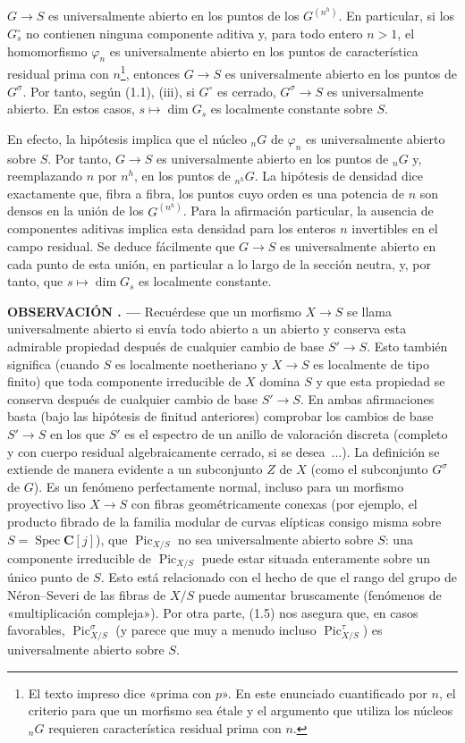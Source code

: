 \documentclass[11pt,twoside,openany]{book}
\numberwithin{equation}{section}
\newcommand{\src}[1]{%
  \phantomsection\hypertarget{src:#1}{}%
  \marginpar{\raggedleft\footnotesize\sffamily #1}%
}
\theoremstyle{plain}
\theoremstyle{definition}
\theoremstyle{remark}
\newcommand{\result}[2]{%
  \par\medskip\noindent\textbf{#1%
  \if\relax\detokenize{#2}\relax\else\space#2\fi. ---}\enspace
}
\newcommand{\FgaUnitKey}{frontmatter}
\renewcommand{\src}[1]{%
  \phantomsection\hypertarget{src:\FgaUnitKey:#1}{}%
  \marginpar{\raggedleft\footnotesize\sffamily #1}%
}
\theoremstyle{plain}
\theoremstyle{definition}
\theoremstyle{remark}
\begin{document}
\src{228}
$G\longrightarrow S$ es universalmente abierto en los puntos de los
$G^{(n^h)}$. En particular, si los $G_s^\circ$ no contienen ninguna componente
aditiva y, para todo entero $n>1$, el homomorfismo $\varphi_n$ es
universalmente abierto en los puntos de característica residual prima con
$n$\footnote{El texto impreso dice «prima con $p$». En este enunciado
cuantificado por $n$, el criterio para que un morfismo sea étale y el argumento que utiliza los
núcleos $ {}_nG$ requieren característica residual prima con $n$.}, entonces
$G\longrightarrow S$ es universalmente abierto en los puntos de $G^\sigma$.
Por tanto, según (1.1), (iii), si $G^\circ$ es cerrado,
$G^\sigma\longrightarrow S$ es universalmente abierto. En estos casos,
$s\longmapsto\dim G_s$ es localmente constante sobre $S$.

En efecto, la hipótesis implica que el núcleo $ {}_nG$ de $\varphi_n$ es
universalmente abierto sobre $S$. Por tanto, $G\longrightarrow S$ es
universalmente abierto en los puntos de $ {}_nG$ y, reemplazando $n$ por
$n^h$, en los puntos de $ {}_{n^h}G$. La hipótesis de densidad dice exactamente que, fibra a fibra, los puntos cuyo
orden es una potencia de $n$ son densos en la unión de los $G^{(n^h)}$. Para
la afirmación particular, la ausencia de componentes aditivas implica esta
densidad para los enteros $n$ invertibles en el campo residual. Se deduce fácilmente que
$G\longrightarrow S$ es universalmente abierto en cada punto de esta unión,
en particular a lo largo de la sección neutra, y, por tanto, que
$s\longmapsto\dim G_s$ es localmente constante.

\result{OBSERVACIÓN}{1.6} Recuérdese que un morfismo $X\longrightarrow S$ se
llama universalmente abierto si envía todo abierto a un abierto y conserva
esta admirable propiedad después de cualquier cambio de base
$S'\longrightarrow S$. Esto también significa (cuando $S$ es localmente
noetheriano y $X\longrightarrow S$ es localmente de tipo finito) que toda
componente irreducible de $X$ domina $S$ y que esta propiedad se conserva
después de cualquier cambio de base $S'\longrightarrow S$. En ambas
afirmaciones basta (bajo las hipótesis de finitud anteriores) comprobar los
cambios de base $S'\longrightarrow S$ en los que $S'$ es el espectro de un
anillo de valoración discreta (completo y con cuerpo residual algebraicamente
cerrado, si se desea~...). La definición se extiende de manera evidente a un
subconjunto $Z$ de $X$ (como el subconjunto $G^\sigma$ de $G$). Es un fenómeno
perfectamente normal, incluso para un morfismo proyectivo liso
$X\longrightarrow S$ con fibras geométricamente conexas (por ejemplo, el
producto fibrado de la familia modular de curvas elípticas consigo misma sobre
$S=\operatorname{Spec}\mathbf C[j]$), que $\operatorname{Pic}_{X/S}$ no sea
universalmente abierto sobre $S$: una componente irreducible de
$\operatorname{Pic}_{X/S}$ puede estar situada enteramente sobre un único
punto de $S$. Esto está relacionado con el hecho de que el rango del grupo de
Néron--Severi de las fibras de $X/S$ puede aumentar bruscamente (fenómenos de
«multiplicación compleja»). Por otra parte, (1.5) nos asegura que, en casos
favorables, $\operatorname{Pic}_{X/S}^\sigma$ (y parece que muy a menudo incluso
$\operatorname{Pic}_{X/S}^\tau$) es universalmente abierto sobre $S$.
\end{document}
